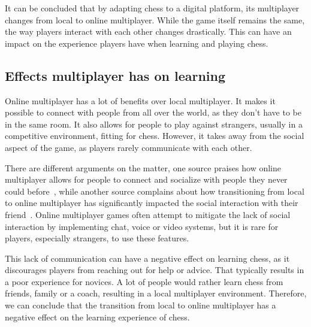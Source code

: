 It can be concluded that by adapting chess to a digital platform, its multiplayer changes from local to online
multiplayer.
While the game itself remains the same, the way players interact with each other changes drastically.
This can have an impact on the experience players have when learning and playing chess.

\subsection{Effects multiplayer has on learning}\label{subsec:effects-multiplayer-has-on-learning}

Online multiplayer has a lot of benefits over local multiplayer.
It makes it possible to connect with people from all over the world, as they don't have to be in the same room.
It also allows for people to play against strangers, usually in a competitive environment, fitting for chess.
However, it takes away from the social aspect of the game, as players rarely communicate with each other.

There are different arguments on the matter, one source praises how online multiplayer allows for people to connect and
socialize with people they never could before~\cite{multiplayer-online}, while another source complains about how
transitioning from local to online multiplayer has significantly impacted the social interaction with their
friend~\cite{multiplayer-local}.
Online multiplayer games often attempt to mitigate the lack of social interaction by implementing chat, voice or video
systems, but it is rare for players, especially strangers, to use these features.

This lack of communication can have a negative effect on learning chess, as it discourages players from reaching out
for help or advice.
That typically results in a poor experience for novices.
A lot of people would rather learn chess from friends, family or a coach, resulting in a local multiplayer environment.
Therefore, we can conclude that the transition from local to online multiplayer has a negative effect on the learning
experience of chess.
